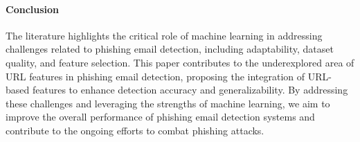 \paragraph{Conclusion}
The literature highlights the critical role of machine learning in addressing challenges related to phishing email detection, including adaptability, dataset quality, and feature selection. This paper contributes to the underexplored area of URL features in phishing email detection, proposing the integration of URL-based features to enhance detection accuracy and generalizability. By addressing these challenges and leveraging the strengths of machine learning, we aim to improve the overall performance of phishing email detection systems and contribute to the ongoing efforts to combat phishing attacks.
